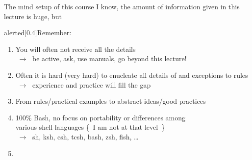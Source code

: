 \begin{frame}{The mind setup of this course}
    I know, the amount of information given in this lecture is huge, but
    \begin{varblock}{alerted}[0.4\textwidth]{Remember:}
    \end{varblock}
    \vspace{1mm}
    \begin{enumerate}[<+(1)->]
        \item You will often not receive all the details\\
              $\;\to\;$ be active, ask, use manuals, go beyond this lecture!
        \item Often it is hard (very hard) to enucleate all details of and exceptions to rules \\
              $\;\to\;$ experience and practice will fill the gap
        \item From rules/practical examples to abstract ideas/good practices
        \item 100\% Bash, no focus on portability or differences among \\ various shell languages {\tiny \{~I am not at that level~\}}\\
              $\;\to\;$ sh, ksh, csh, tcsh, bash, zsh, fish, \ldots
        \item {}
    \end{enumerate}
\end{frame}
